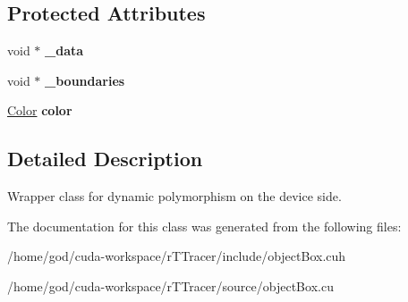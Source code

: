 \subsection*{Protected Attributes}
\begin{DoxyCompactItemize}
\item 
void $\ast$ {\bfseries \+\_\+data}\hypertarget{class_dev_object_a1ccb9bb70f612eab2587599f4fb396fb}{}\label{class_dev_object_a1ccb9bb70f612eab2587599f4fb396fb}

\item 
void $\ast$ {\bfseries \+\_\+boundaries}\hypertarget{class_dev_object_aa87ecaabddb9adc244cf871501715d47}{}\label{class_dev_object_aa87ecaabddb9adc244cf871501715d47}

\item 
\hyperlink{class_color}{Color} {\bfseries color}\hypertarget{class_dev_object_a00c4791a548e2f1a45493bc3cbefba6a}{}\label{class_dev_object_a00c4791a548e2f1a45493bc3cbefba6a}

\end{DoxyCompactItemize}


\subsection{Detailed Description}
Wrapper class for dynamic polymorphism on the device side. 

The documentation for this class was generated from the following files\+:\begin{DoxyCompactItemize}
\item 
/home/god/cuda-\/workspace/r\+T\+Tracer/include/object\+Box.\+cuh\item 
/home/god/cuda-\/workspace/r\+T\+Tracer/source/object\+Box.\+cu\end{DoxyCompactItemize}
